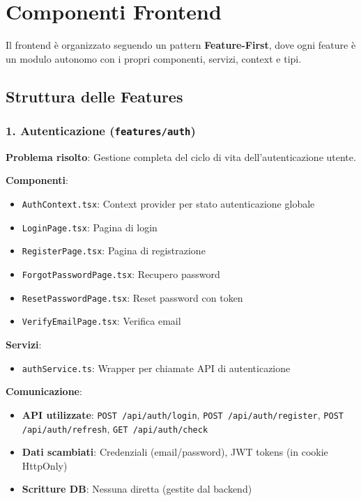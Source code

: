 \documentclass[11pt,a4paper]{article}
\begin{document}
\section{Componenti Frontend}

Il frontend è organizzato seguendo un pattern \textbf{Feature-First}, dove ogni feature è un modulo autonomo con i propri componenti, servizi, context e tipi.

\subsection{Struttura delle Features}

\subsubsection{1. Autenticazione (\texttt{features/auth})}

\textbf{Problema risolto}: Gestione completa del ciclo di vita dell'autenticazione utente.

\textbf{Componenti}:
\begin{itemize}
    \item \texttt{AuthContext.tsx}: Context provider per stato autenticazione globale
    \item \texttt{LoginPage.tsx}: Pagina di login
    \item \texttt{RegisterPage.tsx}: Pagina di registrazione
    \item \texttt{ForgotPasswordPage.tsx}: Recupero password
    \item \texttt{ResetPasswordPage.tsx}: Reset password con token
    \item \texttt{VerifyEmailPage.tsx}: Verifica email
\end{itemize}

\textbf{Servizi}:
\begin{itemize}
    \item \texttt{authService.ts}: Wrapper per chiamate API di autenticazione
\end{itemize}

\textbf{Comunicazione}:
\begin{itemize}
    \item \textbf{API utilizzate}: \texttt{POST /api/auth/login}, \texttt{POST /api/auth/register}, \texttt{POST /api/auth/refresh}, \texttt{GET /api/auth/check}
    \item \textbf{Dati scambiati}: Credenziali (email/password), JWT tokens (in cookie HttpOnly)
    \item \textbf{Scritture DB}: Nessuna diretta (gestite dal backend)
\end{itemize}
\end{document}
